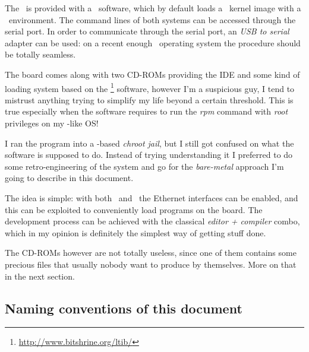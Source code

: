 The \MyBoard\ is provided with a \uBoot\ software, which by default loads
a \Linux\ kernel image with a \BusyBox\ environment. The command lines of
both systems can be accessed through the serial port. In order to
communicate through the serial port, an \emph{USB to serial} adapter can
be used: on a recent enough \GNULinux\ operating system the procedure
should be totally seamless.

The board comes along with two CD-ROMs providing the
 IDE and some kind of loading system based on the
\LTIB\footnote{ \url{http://www.bitshrine.org/ltib/} } software, however
I'm a suspicious guy, I tend to mistrust anything trying to simplify my
life beyond a certain threshold.  This is true especially when the
software requires to run the \emph{rpm} command with \emph{root}
privileges on my \Debian-like OS!

I ran the program into a -based \emph{chroot jail}, but I
still got confused on what the software is supposed to do. Instead of
trying understanding it I preferred to do some retro-engineering of the
system and go for the \emph{bare-metal} approach I'm going to describe in
this document.

The idea is simple: with both \uBoot\ and \Linux\ the Ethernet interfaces
can be enabled, and this can be exploited to conveniently load programs on
the board. The development process can be achieved with the classical
\emph{editor + compiler} combo, which in my opinion is definitely the
simplest way of getting stuff done.

The CD-ROMs however are not totally useless, since one of them contains
some precious files that usually nobody want to produce by themselves.
More on that in the next section.

\subsection{ Naming conventions of this document }

